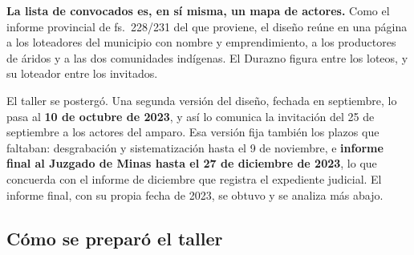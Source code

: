 \begin{cautela}
\textbf{La lista de convocados es, en sí misma, un mapa de actores.} Como el informe provincial de fs.\ 228/231 del que proviene, el diseño reúne en una página a los loteadores del municipio con nombre y emprendimiento, a los productores de áridos y a las dos comunidades indígenas. El Durazno figura entre los loteos, y su loteador entre los invitados.

El taller se postergó. Una segunda versión del diseño, fechada en septiembre, lo pasa al \textbf{10 de octubre de 2023}, y así lo comunica la invitación del 25 de septiembre a los actores del amparo. Esa versión fija también los plazos que faltaban: desgrabación y sistematización hasta el 9 de noviembre, e \textbf{informe final al Juzgado de Minas hasta el 27 de diciembre de 2023}, lo que concuerda con el informe de diciembre que registra el expediente judicial. El informe final, con su propia fecha de 2023, se obtuvo y se analiza más abajo.
\end{cautela}

\subsection*{Cómo se preparó el taller}

